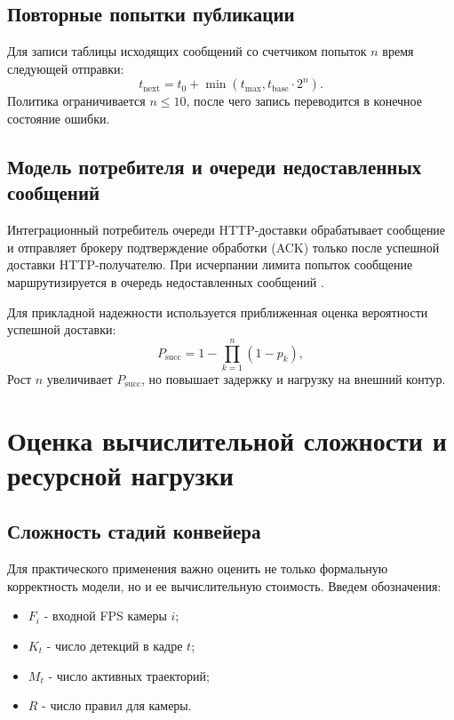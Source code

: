 \subsection{Повторные попытки публикации}

Для записи таблицы исходящих сообщений со счетчиком попыток \(n\) время следующей отправки:
\begin{equation}
t_{\text{next}} = t_0 + \min\left(t_{\max}, t_{\text{base}}\cdot 2^n\right).
\end{equation}
Политика ограничивается \(n \le 10\), после чего запись переводится в конечное состояние ошибки.

\subsection{Модель потребителя и очереди недоставленных сообщений}

Интеграционный потребитель очереди HTTP-доставки обрабатывает сообщение и отправляет брокеру подтверждение обработки (ACK) только после успешной доставки HTTP-получателю. При исчерпании лимита попыток сообщение маршрутизируется в очередь недоставленных сообщений \cite{rabbitmq_confirms,rabbitmq_dlq}.

Для прикладной надежности используется приближенная оценка вероятности успешной доставки:
\begin{equation}
P_{\text{succ}} = 1 - \prod_{k=1}^{n}(1-p_k),
\end{equation}
\where
{}
Рост \(n\) увеличивает \(P_{\text{succ}}\), но повышает задержку и нагрузку на внешний контур.

\section{Оценка вычислительной сложности и ресурсной нагрузки}

\subsection{Сложность стадий конвейера}

Для практического применения важно оценить не только формальную корректность модели, но и ее вычислительную стоимость. Введем обозначения:
\begin{itemize}
    \item \(F_i\) - входной FPS камеры \(i\);
    \item \(K_t\) - число детекций в кадре \(t\);
    \item \(M_t\) - число активных траекторий;
    \item \(R\) - число правил для камеры.
\end{itemize}

